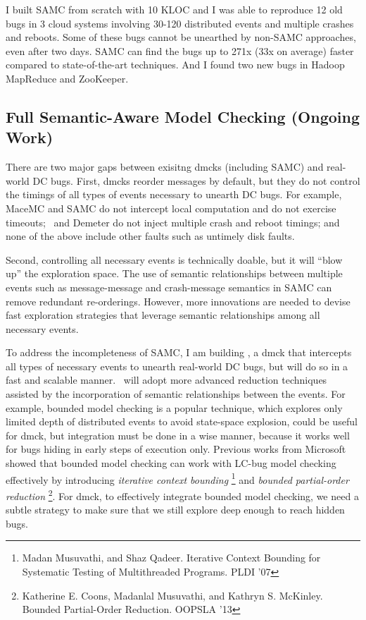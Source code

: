 \documentclass[11pt]{article}
\begin{document}
I built SAMC from scratch with 10 KLOC and I was able to reproduce 12 old bugs
in 3 cloud systems involving 30-120 distributed events and multiple crashes and
reboots. Some of these bugs cannot be unearthed by non-SAMC approaches, even
after two days. SAMC can find the bugs up to 271x (33x on average) faster
compared to state-of-the-art techniques. And I found two new bugs in Hadoop
MapReduce and ZooKeeper.

\subsection{Full Semantic-Aware Model Checking (Ongoing Work)} 

There are two major gaps between exisitng dmcks (including SAMC) and real-world
DC bugs. First, dmcks reorder messages by default, but they do not control the
timings of all types of events necessary to unearth DC bugs. For example, MaceMC
and SAMC do not intercept local computation and do not exercise timeouts;
\modist\ and Demeter do not inject multiple crash and reboot timings; and none
of the above include other faults such as untimely disk faults.

Second, controlling all necessary events is technically doable, but it will
``blow up'' the exploration space. The use of semantic relationships between
multiple events such as message-message and crash-message semantics in SAMC can
remove redundant re-orderings. However, more innovations are needed to devise
fast exploration strategies that leverage semantic relationships among all
necessary events.

To address the incompleteness of SAMC, I am building \fullcheck, a dmck that
intercepts all types of necessary events to unearth real-world DC bugs, but will
do so in a fast and scalable manner. \fullcheck\ will adopt more advanced
reduction techniques assisted by the incorporation of semantic relationships
between the events. For example, bounded model checking is a popular technique,
which explores only limited depth of distributed events to avoid state-space
explosion, could be useful for dmck, but integration must be done in a wise
manner, because it works well for bugs hiding in early steps of execution only.
Previous works from Microsoft showed that bounded model checking can work with
LC-bug model checking effectively by introducing \textit{iterative context
bounding} \footnote{Madan Musuvathi, and Shaz Qadeer. Iterative Context Bounding
for Systematic Testing of Multithreaded Programs. PLDI '07} and \textit{bounded
partial-order reduction} \footnote{Katherine E. Coons, Madanlal Musuvathi, and
Kathryn S. McKinley. Bounded Partial-Order Reduction. OOPSLA '13}. For dmck, to
effectively integrate bounded model checking, we need a subtle strategy to make
sure that we still explore deep enough to reach hidden bugs.
\end{document}
